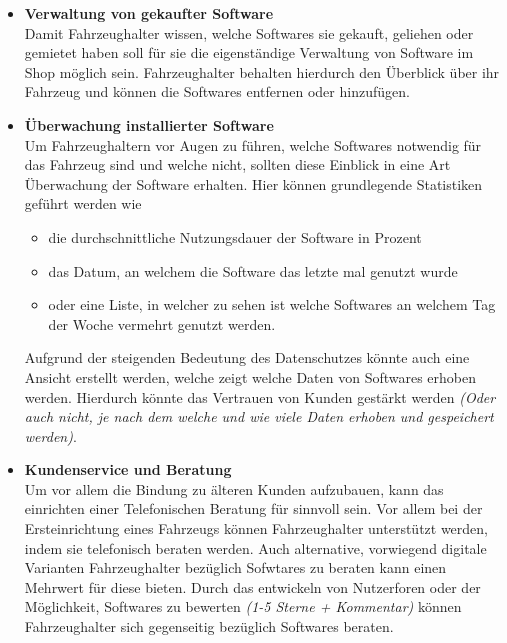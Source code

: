 \begin{itemize}
	\item[] \hspace{-0.6cm} \textbf{Verwaltung von gekaufter Software}\\
	Damit Fahrzeughalter wissen, welche Softwares sie gekauft, geliehen oder gemietet haben soll für sie die eigenständige Verwaltung von Software im Shop möglich sein. Fahrzeughalter behalten hierdurch den Überblick über ihr Fahrzeug und können die Softwares entfernen oder hinzufügen.
	
	\item[] \hspace{-0.6cm} \textbf{Überwachung installierter Software}\\
	Um Fahrzeughaltern vor Augen zu führen, welche Softwares notwendig für das Fahrzeug sind und welche nicht, sollten diese Einblick in eine Art Überwachung der Software erhalten. Hier können grundlegende Statistiken geführt werden wie
	\begin{itemize}
		\item die durchschnittliche Nutzungsdauer der Software in Prozent
		\item das Datum, an welchem die Software das letzte mal genutzt wurde
		\item oder eine Liste, in welcher zu sehen ist welche Softwares an welchem Tag der Woche vermehrt genutzt werden.
	\end{itemize}
	Aufgrund der steigenden Bedeutung des Datenschutzes könnte auch eine Ansicht erstellt werden, welche zeigt welche Daten von Softwares erhoben werden. Hierdurch könnte das Vertrauen von Kunden gestärkt werden \textit{(Oder auch nicht, je nach dem welche und wie viele Daten erhoben und gespeichert werden)}.
	
	\item[] \hspace{-0.6cm} \textbf{Kundenservice und Beratung}\\
	Um vor allem die Bindung zu älteren Kunden aufzubauen, kann das einrichten einer Telefonischen Beratung für sinnvoll sein. Vor allem bei der Ersteinrichtung eines Fahrzeugs können Fahrzeughalter unterstützt werden, indem sie telefonisch beraten werden. Auch alternative, vorwiegend digitale Varianten Fahrzeughalter bezüglich Sofwtares zu beraten kann einen Mehrwert für diese bieten. Durch das entwickeln von Nutzerforen oder der Möglichkeit, Softwares zu bewerten \textit{(1-5 Sterne + Kommentar)} können Fahrzeughalter sich gegenseitig bezüglich Softwares beraten.
\end{itemize}
